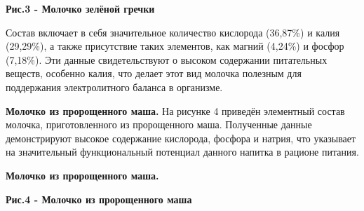
{\bfseries Рис.3 - Молочко зелёной гречки}

\begin{multicols}{2}
Состав включает в себя значительное количество кислорода (36,87\%) и
калия (29,29\%), а также присутствие таких элементов, как магний
(4,24\%) и фосфор (7,18\%). Эти данные свидетельствуют о высоком
содержании питательных веществ, особенно калия, что делает этот вид
молочка полезным для поддержания электролитного баланса в организме.

{\bfseries Молочко из пророщенного маша.} На рисунке 4 приведён элементный
состав молочка, приготовленного из пророщенного маша. Полученные данные
демонстрируют высокое содержание кислорода, фосфора и натрия, что
указывает на значительный функциональный потенциал данного напитка в
рационе питания.
\end{multicols}

{\bfseries Молочко из пророщенного маша.}




{\bfseries Рис.4 - Молочко из пророщенного маша}


